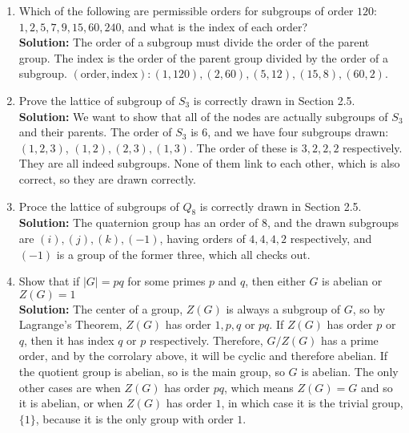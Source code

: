 \documentclass{article}
\begin{document}
\begin{enumerate}
    \item Which of the following are permissible orders for subgroups of order $120$: $1,2,5,7,9,15,60,240$, and what is the index of each order? \\ \textbf{Solution:} The order of a subgroup must divide the order of the parent group. The index is the order of the parent group divided by the order of a subgroup. $(\text{order},\text{index}): (1,120), (2,60), (5,12), (15,8), (60,2)$.
    \item Prove the lattice of subgroup of $S_3$ is correctly drawn in Section 2.5. \\ \textbf{Solution:} We want to show that all of the nodes are actually subgroups of $S_3$ and their parents. The order of $S_3$ is 6, and we have four subgroups drawn: $(1,2,3)$, $(1,2),(2,3),(1,3)$. The order of these is $3,2,2,2$ respectively. They are all indeed subgroups. None of them link to each other, which is also correct, so they are drawn correctly. 
    \item Proce the lattice of subgroups of $Q_8$ is correctly drawn in Section 2.5. \\ \textbf{Solution:} The quaternion group has an order of $8$, and the drawn subgroups are $(i),(j),(k),(-1)$, having orders of $4,4,4,2$ respectively, and $(-1)$ is a group of the former three, which all checks out.
    \item Show that if $\vert G \vert = pq$ for some primes $p$ and $q$, then either $G$ is abelian or $Z(G) = 1$ \\ \textbf{Solution:} The center of a group, $Z(G)$ is always a subgroup of $G$, so by Lagrange's Theorem, $Z(G)$ has order $1,p,q$ or $pq$. If $Z(G)$ has order $p$ or $q$, then it has index $q$ or $p$ respectively. Therefore, $G/Z(G)$ has a prime order, and by the corrolary above, it will be cyclic and therefore abelian. If the quotient group is abelian, so is the main group, so $G$ is abelian. The only other cases are when $Z(G)$ has order $pq$, which means $Z(G) = G$ and so it is abelian, or when $Z(G)$ has order $1$, in which case it is the trivial group, $\{1\}$, because it is the only group with order $1$. 
\end{enumerate}
\end{document}
